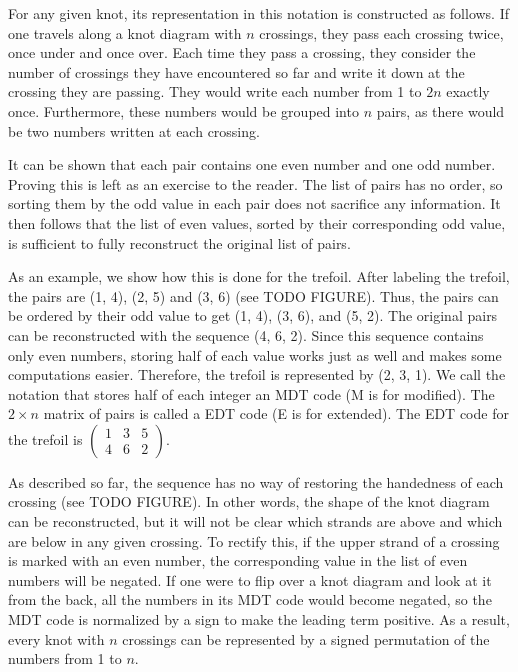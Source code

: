 \begin{paper}
For any given knot, its representation in this notation is constructed as
follows.
If one travels along a knot diagram with $n$ crossings, they pass each crossing
twice, once under and once over.
Each time they pass a crossing, they consider the number of crossings they
have encountered so far and write it down at the crossing they are passing.
They would write each number from 1 to $2n$ exactly once.
Furthermore, these numbers would be grouped into $n$ pairs, as there would be
two numbers written at each crossing.

It can be shown that each pair contains one even number and one odd number.
Proving this is left as an exercise to the reader.
The list of pairs has no order, so sorting them by the odd value in each pair
does not sacrifice any information.
It then follows that the list of even values, sorted by their corresponding odd
value, is sufficient to fully reconstruct the original list of pairs.

As an example, we show how this is done for the trefoil.
After labeling the trefoil, the pairs are (1, 4), (2, 5) and (3, 6) (see TODO
FIGURE).
Thus, the pairs can be ordered by their odd value to get (1, 4), (3, 6), and
(5, 2).
The original pairs can be reconstructed with the sequence (4, 6, 2).
Since this sequence contains only even numbers, storing half of each value works
just as well and makes some computations easier.
Therefore, the trefoil is represented by (2, 3, 1).
We call the notation that stores half of each integer an MDT code (M is for
modified).
The $2\times n$ matrix of pairs is called a EDT code (E is for extended).
The EDT code for the trefoil is $\begin{pmatrix}1&3&5\\4&6&2\end{pmatrix}$.

As described so far, the sequence has no way of restoring the handedness of each
crossing (see TODO FIGURE).
In other words, the shape of the knot diagram can be reconstructed, but it will
not be clear which strands are above and which are below in any given crossing.
To rectify this, if the upper strand of a crossing is marked with an even
number, the corresponding value in the list of even numbers will be negated.
If one were to flip over a knot diagram and look at it from the back, all the
numbers in its MDT code would become negated, so the MDT code is normalized by a
sign to make the leading term positive.
As a result, every knot with $n$ crossings can be represented by a signed
permutation of the numbers from 1 to $n$.


\end{paper}
